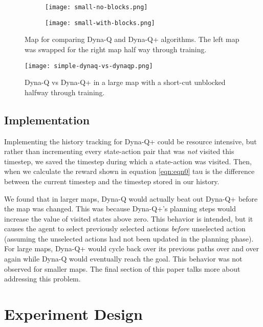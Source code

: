 \documentclass{article}
\begin{document}
\begin{figure}[H]
    \begin{subfigure}{.5\textwidth}
      \texttt{[image: small-no-blocks.png]}
    \end{subfigure}
    \begin{subfigure}{.5\textwidth}
      \texttt{[image: small-with-blocks.png]}
    \end{subfigure}
    \caption{Map for comparing Dyna-Q and Dyna-Q+ algorithms. The left map was swapped for the right map half way through training.}
    \label{fig:graph_1}
  \end{figure}

  \begin{figure}[H]
    \centering
        \texttt{[image: simple-dynaq-vs-dynaqp.png]}
    \caption{Dyna-Q vs Dyna-Q+ in a large map with a short-cut unblocked halfway through training.}
    \label{}
\end{figure}

\subsection{Implementation}

Implementing the history tracking for Dyna-Q+ could be resource intensive, but rather than incrementing every state-action pair that was \textit{not} visited this timestep, we saved the timestep during which a state-action was visited. Then, when we calculate the reward shown in equation \ref{eqn:eqn0} tau is the difference between the current timestep and the timestep stored in our history. 

We found that in larger maps, Dyna-Q would actually beat out Dyna-Q+ before the map was changed. This was because Dyna-Q+'s planning steps would increase the value of visited states above zero. This behavior is intended, but it causes the agent to select previously selected actions \textit{before} unselected action (assuming the unselected actions had not been updated in the planning phase). For large maps, Dyna-Q+ would cycle back over its previous paths over and over again while Dyna-Q would eventually reach the goal. This behavior was not observed for smaller maps. The final section of this paper talks more about addressing this problem. 

\section{Experiment Design}
\end{document}
